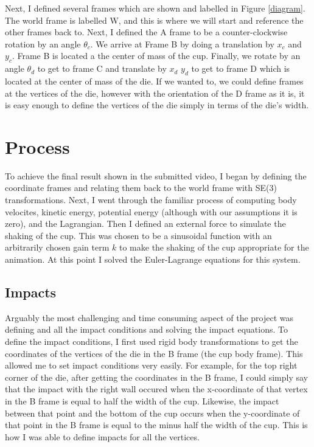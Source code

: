 Next, I defined several frames which are shown and labelled in Figure \ref{diagram}. The world frame is labelled {W}, and this is where we will start and reference
the other frames back to. Next, I defined the A frame to be a counter-clockwise rotation by an angle $\theta_c$. We arrive at Frame {B} by doing a translation by $x_c$ and $y_c$.
Frame B is located a the center of mass of the cup. Finally, we rotate by an angle $\theta_d$ to get to frame {C} and translate by $x_d$ $y_d$ to get to frame {D} which is located at 
the center of mass of the die. If we wanted to, we could define frames at the vertices of the die, however with the orientation of the {D} frame as it is, it is easy enough to define 
the vertices of the die simply in terms of the die's width.

\section{Process}
To achieve the final result shown in the submitted video, I began by defining the coordinate frames and relating them back to the world frame with SE(3) transformations. Next, I went
through the familiar process of computing body velocites, kinetic energy, potential energy (although with our assumptions it is zero), and the Lagrangian. Then I defined an external force
to simulate the shaking of the cup. This was chosen to be a sinusoidal function with an arbitrarily chosen gain term $k$ to make the shaking of the cup appropriate for the animation.
At this point I solved the Euler-Lagrange equations for this system.
\subsection{Impacts}
Arguably the most challenging and time consuming aspect of the project was defining and all the impact conditions and solving the impact equations. To define the impact conditions, I first used
rigid body transformations to get the coordinates of the vertices of the die in the {B} frame (the cup body frame). This allowed me to set impact conditions very easily. For example, for the
top right corner of the die, after getting the coordinates in the {B} frame, I could simply say that the impact with the right wall occured when the x-coordinate of that vertex in the {B} frame 
is equal to half the width of the cup. Likewise, the impact between that point and the bottom of the cup occurs when the y-coordinate of that point in the {B} frame is equal to the minus half 
the width of the cup. This is how I was able to define impacts for all the vertices. 
